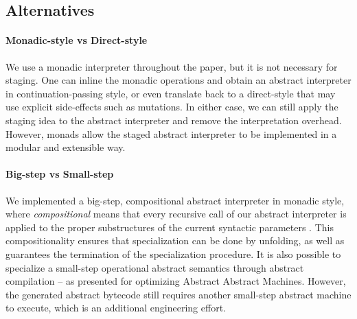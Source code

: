 \subsection{Alternatives}

\paragraph{Monadic-style vs Direct-style} We use a monadic interpreter
throughout the paper, but it is not necessary for staging. One can inline the
monadic operations and obtain an abstract interpreter in continuation-passing
style, or even translate back to a direct-style that may use explicit
side-effects such as mutations. In either case, we can still apply the staging
idea to the abstract interpreter and remove the interpretation overhead.
However, monads allow the staged abstract interpreter to be implemented in a
modular and extensible way.

\paragraph{Big-step vs Small-step}

We implemented a big-step, compositional abstract interpreter in monadic
style, where \textit{compositional} means that every recursive call of our abstract
interpreter is applied to the proper substructures of the current syntactic
parameters \cite{10.1007/3-540-61580-6_11}. This compositionality ensures that
specialization can be done by unfolding, as well as guarantees the termination
of the specialization procedure. It is also possible to specialize a small-step
operational abstract semantics through abstract compilation
\cite{Boucher:1996:ACN:647473.727587} -- as
\citet{Johnson:2013:OAA:2500365.2500604} presented for
optimizing Abstract Abstract Machines. However, the generated abstract
bytecode still requires another small-step abstract machine to execute, which is
an additional engineering effort.

